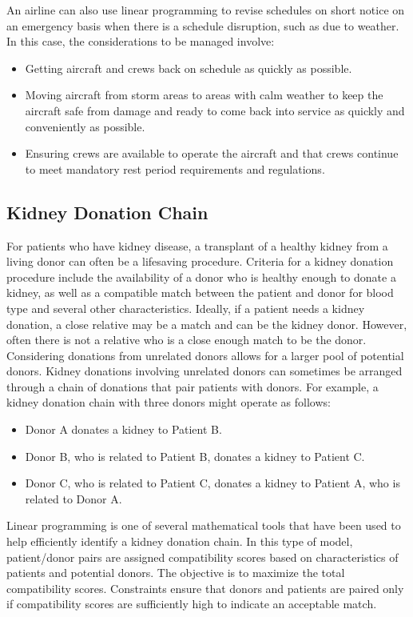 An airline can also use linear programming to revise schedules on short notice on an emergency basis when there is a schedule disruption, such as due to weather. In this case, the considerations to be managed involve:
\begin{itemize}
    \item Getting aircraft and crews back on schedule as quickly as possible.
    \item Moving aircraft from storm areas to areas with calm weather to keep the aircraft safe from damage and ready to come back into service as quickly and conveniently as possible.
    \item Ensuring crews are available to operate the aircraft and that crews continue to meet mandatory rest period requirements and regulations.
\end{itemize}

\subsection{Kidney Donation Chain}

For patients who have kidney disease, a transplant of a healthy kidney from a living donor can often be a lifesaving procedure. Criteria for a kidney donation procedure include the availability of a donor who is healthy enough to donate a kidney, as well as a compatible match between the patient and donor for blood type and several other characteristics. Ideally, if a patient needs a kidney donation, a close relative may be a match and can be the kidney donor. However, often there is not a relative who is a close enough match to be the donor. Considering donations from unrelated donors allows for a larger pool of potential donors. Kidney donations involving unrelated donors can sometimes be arranged through a chain of donations that pair patients with donors. For example, a kidney donation chain with three donors might operate as follows:
\begin{itemize}
    \item Donor A donates a kidney to Patient B.
    \item Donor B, who is related to Patient B, donates a kidney to Patient C.
    \item Donor C, who is related to Patient C, donates a kidney to Patient A, who is related to Donor A.
\end{itemize}

Linear programming is one of several mathematical tools that have been used to help efficiently identify a kidney donation chain. In this type of model, patient/donor pairs are assigned compatibility scores based on characteristics of patients and potential donors. The objective is to maximize the total compatibility scores. Constraints ensure that donors and patients are paired only if compatibility scores are sufficiently high to indicate an acceptable match.

